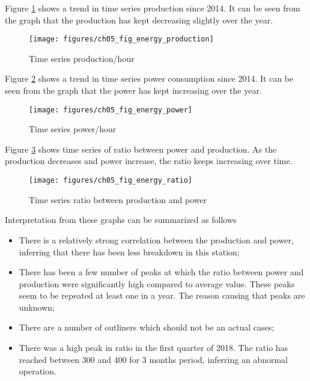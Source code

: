 Figure \ref{ch05_fig_energy_production} shows a trend in time series production since 2014. It can be seen from the graph that the production has kept decreasing slightly over the year. 

\begin{figure}[!htb]
	\texttt{[image: figures/ch05\_fig\_energy\_production]} \\
	\caption{Time series production/hour}
	\label{ch05_fig_energy_production} 
\end{figure}

Figure \ref{ch05_fig_energy_power} shows a trend in time series power consumption since 2014. It can be seen from the graph that the power has kept increasing over the year. 

\begin{figure}[!htb]
	\texttt{[image: figures/ch05\_fig\_energy\_power]} \\
	\caption{Time series power/hour}
	\label{ch05_fig_energy_power} 
\end{figure}
Figure \ref{ch05_fig_energy_ratio} shows time series of ratio between power and production. As the production decreases and power increase, the ratio keeps increasing over time. 

\begin{figure}[!htb]
	
	\texttt{[image: figures/ch05\_fig\_energy\_ratio]} \\
	\caption{Time series ratio between production and power}
	\label{ch05_fig_energy_ratio} 
\end{figure}

Interpretation from these graphs can be summarized as follows

\begin{itemize}
	\item There is a relatively strong correlation between the production and power, inferring that there has been less breakdown in this station;
	\item There has been a few number of peaks at which the ratio between power and production were significantly high compared to average value. These peaks seem to be repeated at least one in a year. The reason causing that peaks are unknown;
	\item There are a number of outliners which should not be an actual cases;
	\item There was a high peak in ratio in the first quarter of 2018. The ratio has reached between 300 and 400 for 3 months period, inferring an abnormal operation.
\end{itemize}


